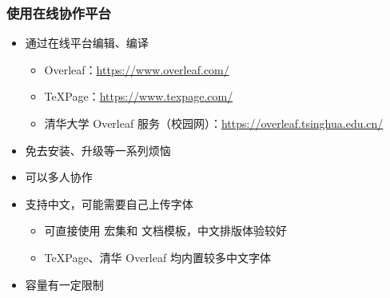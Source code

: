 \begin{frame}[fragile]
  \frametitle{使用在线协作平台}
  \begin{itemize}
    \item 通过在线平台编辑、编译
      \begin{itemize}
        \item Overleaf：\url{https://www.overleaf.com/}
        \item TeXPage：\url{https://www.texpage.com/}
        \item 清华大学 Overleaf 服务（校园网）：\url{https://overleaf.tsinghua.edu.cn/}
      \end{itemize}
    \item 免去安装、升级等一系列烦恼
    \item 可以多人协作
    \item 支持中文，可能需要自己上传字体
      \begin{itemize}
        \item 可直接使用  宏集和  文档模板，中文排版体验较好
        \item TeXPage、清华 Overleaf 均内置较多中文字体
      \end{itemize}
    \item 容量有一定限制
  \end{itemize}
\end{frame}



